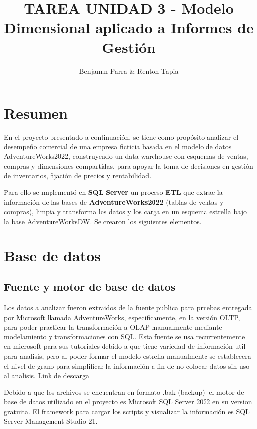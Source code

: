 \documentclass{article}
\title{TAREA UNIDAD 3 -  Modelo Dimensional aplicado a Informes de Gestión}
\author{Benjamin Parra & Renton Tapia}
\begin{document}
\maketitle


\section{Resumen}

En el proyecto presentado a continuación, se tiene como propósito analizar el desempeño comercial de una empresa ficticia basada en el modelo de datos AdventureWorks2022, construyendo un data warehouse con esquemas de ventas, compras y dimensiones compartidas, para apoyar la toma de decisiones en gestión de inventarios, fijación de precios y rentabilidad.

Para ello se implementó en \textbf{SQL Server} un proceso \textbf{ETL} que extrae la información de las bases de \textbf{AdventureWorks2022} (tablas de ventas y compras), limpia y transforma los datos y los carga en un esquema estrella bajo la base AdventureWorksDW. Se crearon los siguientes elementos.

\section{Base de datos}

\subsection{Fuente y motor de base de datos}

Los datos a analizar fueron extraidos de la fuente publica para pruebas entregada por Microsoft llamada AdventureWorks, especificamente, en la versión OLTP, para poder practicar la transformación a OLAP manualmente mediante modelamiento y transformaciones con SQL. Esta fuente se usa recurrentemente en microsoft para sus tutoriales debido a que tiene variedad de información util para analisis, pero al poder formar el modelo estrella manualmente se establecera el nivel de grano para simplificar la información a fin de no colocar datos sin uso al analisis.
\href{https://learn.microsoft.com/es-es/sql/samples/adventureworks-install-configure?view=sql-server-ver17&tabs=ssms}{Link de descarga}

Debido a que los archivos se encuentran en formato .bak (backup), el motor de base de datos utilizado en el proyecto es Microsoft SQL Server 2022 en su version gratuita. El framework para cargar los scripts y visualizar la información es SQL Server Management Studio 21.
\end{document}
